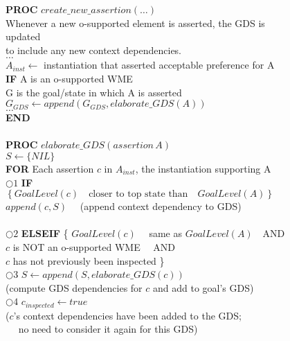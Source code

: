 {\begin{figure}[h]
{\begin{minipage}{\textwidth}
\begin{tabbing}
\textbf{PROC} $create\_new\_assertion(\ldots)$ \\
\> Whenever a new o-supported element is asserted, the GDS is updated \\ 
\> to include any new context dependencies.  \\
\> $\ldots$\\
\> $A_{inst} \leftarrow $ instantiation that asserted acceptable preference for A  \\
\> \textbf{IF} A is an o-supported WME\\
\>\>G is the goal/state in which A is asserted \\
\>\>$G_{GDS} \leftarrow append(G_{GDS}, elaborate\_GDS(A)) $ \\

\>$\ldots$\\
\textbf{END} \\

\\
\textbf{PROC} $elaborate\_GDS(assertion\, A)$ \\
\> $S \leftarrow \{ NIL \} $ \\
        \>\textbf{FOR} Each assertion  $c$ in $A_{inst}$, the instantiation supporting A \\
$\bigcirc \! \! \! \! 1$      
          \>\>     \textbf{IF} $\left\{ GoalLevel(c) \quad\mbox{closer to top state than}\quad GoalLevel(A) \right\}$ \\

           \>\>\>\>              $append(c,S)\quad$ (append context dependency to GDS) \\
\\
$\bigcirc \! \! \! \! 2$
             \>\>   \textbf{ELSEIF} \{ \>\>\> $GoalLevel(c) \quad$ same as $GoalLevel(A)  \quad\mbox{AND}\quad $ \\
              \>\>\> \> \>    $c$ is NOT an o-supported WME $\quad\mbox{AND}\quad $ \\
\>\>\> \> \>  $c$ has not previously been inspected \} \\
$\bigcirc \! \! \! \! 3$               \>\>\>\>          $S \leftarrow append(S,elaborate\_GDS(c))$ \\
\>\>\>\>\>(compute GDS dependencies for $c$ and add to goal's GDS) \\
$\bigcirc \! \! \! \! 4$               \>\>\>\>          $c_{inspected} \leftarrow true \quad $ \\
\>\>\>\>\>($c$'s context dependencies have been added to the GDS;  \\
\>\>\>\>\>~~ no need to consider it again for this GDS)



\end{tabbing}
\end{minipage}}
\end{figure}}
